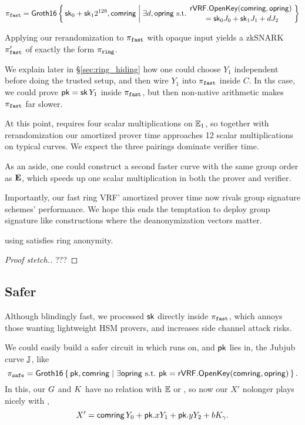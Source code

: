 $$ \pifast = \rrSNARK \Setst{ \sk_0 + \sk_1 2^{128}, \comring }{
 \exists d,\openring \textrm{\ s.t.\ }
 \genfrac{}{}{0pt}{}{ \rVRF.\OpenKey(\comring,\openring) }{ \,\, = \sk_0 \genJ_0 + \sk_1 \genJ_1 + d \genJ_2 }
} $$ %

Applying our rerandomization to $\pi_{\mathtt{fast}}$ with opaque input yields
a zkSNARK $\pi_{\mathtt{fast}}'$ of exactly the form $\pi_{\mathtt{ring}}$.

We explain later in \S\ref{sec:ring_hiding} how one could
choose $Y_1$ independent before doing the trusted setup,
 and then wire $Y_1$ into $\pi_{\mathtt{fast}}$ inside $C$.
In ths case, we could prove $\mathsf{pk} = \mathsf{sk}\, Y_1$ inside $\pi_{\mathtt{fast}}$, but then
non-native arithmetic makes $\pi_{\mathtt{fast}}$ far slower.

At this point, \PedVRF requires four scalar multiplications on ${\mathbb{E}}_1$,
so together with rerandomization our amortized prover time
 approaches 12 scalar multiplications on typical curves. 
We expect the three pairings dominate verifier time.

As an aside, one could construct a second faster curve with the same
group order as ${\mathbf{E}}$, which speeds up one scalar multiplication
 in both the prover and verifier. 

Importantly, our fast ring VRF' amortized prover time now rivals
group signature schemes' performance.  We hope this ends the temptation
to deploy group signature like constructions where the deanonymization vectors matter.

\begin{proposition}\label{prop:pifast_anonymity}
\rVRF using \pifast satisfies ring anonymity.
\end{proposition}

\begin{proof}[Proof stetch.]
???
\end{proof}


\subsection{Safer}

Although blindingly fast, we processed $\mathsf{sk}$ directly inside $\pi_{\mathtt{fast}}$,
which annoys those wanting lightweight HSM provers, and
increases side channel attack risks.

We could easily build a safer circuit in which
\PedVRF runs on, and $\mathsf{pk}$ lies in, the Jubjub curve ${\mathbb{J}}$, like 
$$ \pisafe = \rrSNARK \Setst{ \pk, \comring }{
 \exists \openring \textrm{\ s.t.\ }
 \pk = \rVRF.\OpenKey(\comring,\openring)
} \mathperiod $$
In this, our $G$ and $K$ have no relation with ${\mathbb{E}}$
or \pisafe, so now our $X'$ nolonger plays nicely with \PedVRF, 
$$ X' = \mathsf{comring}\, Y_0 + \mathsf{pk}.x Y_1 + \mathsf{pk}.y Y_2 + b K_\gamma . $$

